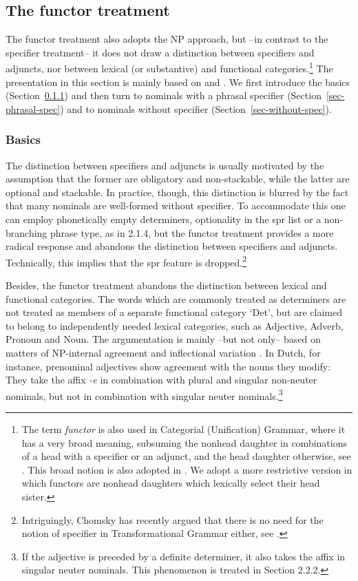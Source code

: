 \documentclass[output=paper]{langsci/langscibook}
\begin{document}
\subsection{The functor treatment} 


The functor treatment also adopts the NP approach, but --in contrast to the 
specifier treatment-- it does not draw a distinction between specifiers and adjuncts, 
nor between lexical (or substantive) and functional categories.\footnote{The term \emph{functor} 
is also used in Categorial (Unification) Grammar, where it has 
a very broad meaning, subsuming the nonhead daughter in combinations of a 
head with a specifier or an adjunct, and the head daughter otherwise, 
see \citet{Bouma88}. This broad notion is also adopted in 
\citet{Reape94}. We adopt a more restrictive version in which functors 
are nonhead daughters which lexically select their head sister.}  
The presentation in this section is mainly based on \citet{VanEynde06} 
and \citet{Allegranza06}. We first introduce the basics (Section~\ref{sec-basics}) and then 
turn to nominals with a phrasal specifier (Section~\ref{sec-phrasal-spec}) and to nominals without specifier (Section~\ref{sec-without-spec}).    


\subsubsection{Basics} 
\label{sec-basics}


The distinction between specifiers and adjuncts is usually motivated by 
the assumption that the former are obligatory and non-stackable, while the latter  
are optional and stackable. In practice, though, this distinction 
is blurred by the fact that many nominals are well-formed without specifier.
To accommodate this one can employ phonetically empty determiners, optionality in 
the {\sc spr} list or a non-branching phrase type, as in 2.1.4,   
but the functor treatment provides a more radical response and abandons 
the distinction between specifiers and adjuncts. 
Technically, this implies that the {\sc spr} feature is dropped.\footnote{Intriguingly,
Chomsky has recently argued that there is no need for the notion of specifier in 
Transformational Grammar either, see \citet[43]{Chomsky13}.}  

Besides, the functor treatment abandons the distinction between lexical and 
functional categories. The words which are commonly treated as determiners
are not treated as members of a separate functional category `Det', but are 
claimed to belong to independently needed lexical categories, such as Adjective, 
Adverb, Pronoun and Noun. The argumentation is mainly --but not only-- based on 
matters of NP-internal agreement and inflectional variation \citep{VanEynde06}. 
In Dutch, for instance, prenominal adjectives show agreement with 
the nouns they modify: They take the affix \emph{-e} in combination with plural 
and singular non-neuter nominals, but not in combination with singular 
neuter nominals.\footnote{If the adjective is preceded by a definite determiner, 
it also takes the affix in singular neuter nominals. This phenomenon is treated 
in Section 2.2.2.} 
\end{document}
